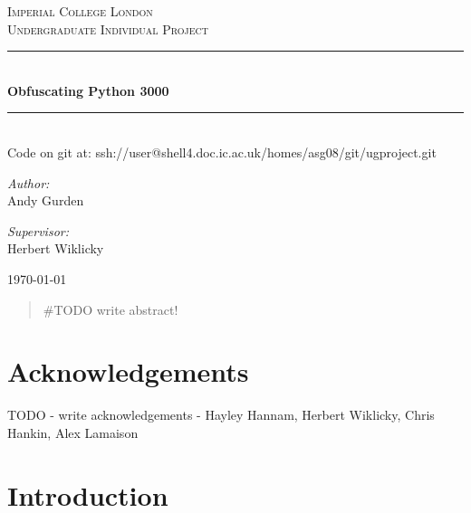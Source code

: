 \documentclass[twoside,a4paper]{report}
\newcommand{\HRule}{\rule{\linewidth}{0.5mm}}
\begin{document}
\begin{titlepage}

\begin{center}

\textsc{\LARGE Imperial College London}\\[1.5cm]
\textsc{\Large Undergraduate Individual Project}\\[0.5cm]

\HRule \\[0.4cm]
{\huge \bfseries Obfuscating Python 3000} \\[0.4cm]
\HRule \\[0.4cm]

Code on git at: ssh://user@shell4.doc.ic.ac.uk/homes/asg08/git/ugproject.git \\[1.5cm]

\begin{minipage}{0.4\textwidth}
\begin{flushleft} \large
\emph{Author:}\\
Andy Gurden
\end{flushleft}
\end{minipage}
\begin{minipage}{0.4\textwidth}
\begin{flushright} \large
\emph{Supervisor:} \\
Herbert Wiklicky
\end{flushright}
\end{minipage}

\vfill

{\large \today}

\end{center}
\end{titlepage}

\cleardoublepage

\begin{abstract}
\#TODO write abstract!
\end{abstract}

\section*{Acknowledgements}

TODO - write acknowledgements - Hayley Hannam, Herbert Wiklicky, Chris Hankin, Alex Lamaison

\tableofcontents

\clearpage

\section{Introduction}
\end{document}
